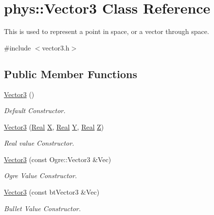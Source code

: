 \hypertarget{classphys_1_1Vector3}{
\section{phys::Vector3 Class Reference}
\label{d5/d6a/classphys_1_1Vector3}
}


This is used to represent a point in space, or a vector through space.  




{\ttfamily \#include $<$vector3.h$>$}

\subsection*{Public Member Functions}
\begin{DoxyCompactItemize}
\item 
\hyperlink{classphys_1_1Vector3_af328c400a03fdb8d2a99fd58382d61cb}{Vector3} ()
\begin{DoxyCompactList}\small\item\em Default Constructor. \item\end{DoxyCompactList}\item 
\hyperlink{classphys_1_1Vector3_af1d323b44d7b6ee3d0a79a196d9967da}{Vector3} (\hyperlink{namespacephys_af7eb897198d265b8e868f45240230d5f}{Real} \hyperlink{classphys_1_1Vector3_a23660f9d1e21a25c53aa06aa737bb56b}{X}, \hyperlink{namespacephys_af7eb897198d265b8e868f45240230d5f}{Real} \hyperlink{classphys_1_1Vector3_a6c9bc2ab0995d5056dba8272c650e58e}{Y}, \hyperlink{namespacephys_af7eb897198d265b8e868f45240230d5f}{Real} \hyperlink{classphys_1_1Vector3_a53c84fa4b38fb9c4a4d822b04c200b13}{Z})
\begin{DoxyCompactList}\small\item\em Real value Constructor. \item\end{DoxyCompactList}\item 
\hyperlink{classphys_1_1Vector3_ac08281de8f4929593b6f4469646691da}{Vector3} (const Ogre::Vector3 \&Vec)
\begin{DoxyCompactList}\small\item\em Ogre Value Constructor. \item\end{DoxyCompactList}\item 
\hyperlink{classphys_1_1Vector3_ac13a263c5e2f84578884183cee890570}{Vector3} (const btVector3 \&Vec)
\begin{DoxyCompactList}\small\item\em Bullet Value Constructor. \item\end{DoxyCompactList}\item 

\end{DoxyCompactItemize}
